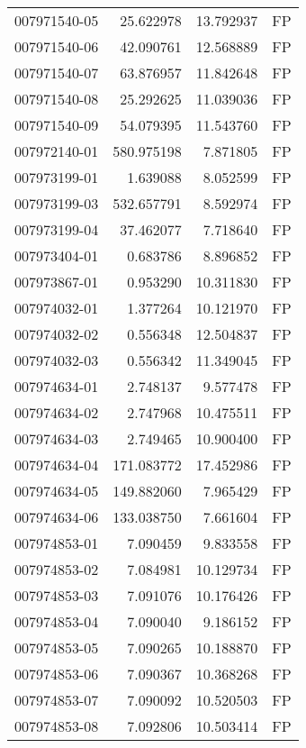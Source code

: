 \begin{tabular}{lrrl}
007971540-05 &   25.622978 &      13.792937 &   FP \\
007971540-06 &   42.090761 &      12.568889 &   FP \\
007971540-07 &   63.876957 &      11.842648 &   FP \\
007971540-08 &   25.292625 &      11.039036 &   FP \\
007971540-09 &   54.079395 &      11.543760 &   FP \\
007972140-01 &  580.975198 &       7.871805 &   FP \\
007973199-01 &    1.639088 &       8.052599 &   FP \\
007973199-03 &  532.657791 &       8.592974 &   FP \\
007973199-04 &   37.462077 &       7.718640 &   FP \\
007973404-01 &    0.683786 &       8.896852 &   FP \\
007973867-01 &    0.953290 &      10.311830 &   FP \\
007974032-01 &    1.377264 &      10.121970 &   FP \\
007974032-02 &    0.556348 &      12.504837 &   FP \\
007974032-03 &    0.556342 &      11.349045 &   FP \\
007974634-01 &    2.748137 &       9.577478 &   FP \\
007974634-02 &    2.747968 &      10.475511 &   FP \\
007974634-03 &    2.749465 &      10.900400 &   FP \\
007974634-04 &  171.083772 &      17.452986 &   FP \\
007974634-05 &  149.882060 &       7.965429 &   FP \\
007974634-06 &  133.038750 &       7.661604 &   FP \\
007974853-01 &    7.090459 &       9.833558 &   FP \\
007974853-02 &    7.084981 &      10.129734 &   FP \\
007974853-03 &    7.091076 &      10.176426 &   FP \\
007974853-04 &    7.090040 &       9.186152 &   FP \\
007974853-05 &    7.090265 &      10.188870 &   FP \\
007974853-06 &    7.090367 &      10.368268 &   FP \\
007974853-07 &    7.090092 &      10.520503 &   FP \\
007974853-08 &    7.092806 &      10.503414 &   FP \\

\end{tabular}
